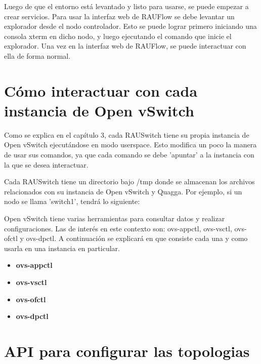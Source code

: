 Luego de que el entorno está levantado y listo para usarse, se puede empezar a crear servicios. Para usar la interfaz web de RAUFlow se debe levantar un explorador desde el nodo controlador. Esto se puede lograr primero iniciando una consola xterm en dicho nodo, y luego ejecutando el comando que inicie el explorador. Una vez en la interfaz web de RAUFlow, se puede interactuar con ella de forma normal.

\section{Cómo interactuar con cada instancia de Open vSwitch}
Como se explica en el capítulo 3, cada RAUSwitch tiene su propia instancia de Open vSwitch ejecutándose en modo userspace. Esto modifica un poco la manera de usar sus comandos, ya que cada comando se debe 'apuntar' a la instancia con la que se desea interactuar.

Cada RAUSwitch tiene un directorio bajo /tmp donde se almacenan los archivos relacionados con su instancia de Open vSwitch y Quagga. Por ejemplo, si un nodo se llama 'switch1', tendrá lo siguiente:


Open vSwitch tiene varias herramientas para consultar datos y realizar configuraciones. Las de interés en este contexto son: ovs-appctl, ovs-vsctl, ovs-ofctl y ovs-dpctl. A continuación se explicará en que consiste cada una y como usarla en una instancia en particular.

\begin{itemize}
	\item \textbf{ovs-appctl} \cite{ovs-appctl}
	\item \textbf{ovs-vsctl} \cite{ovs-vsctl}
	\item \textbf{ovs-ofctl} \cite{ovs-ofctl}
	\item \textbf{ovs-dpctl} \cite{ovs-dpctl}
\end{itemize}

\section{API para configurar las topologias}

